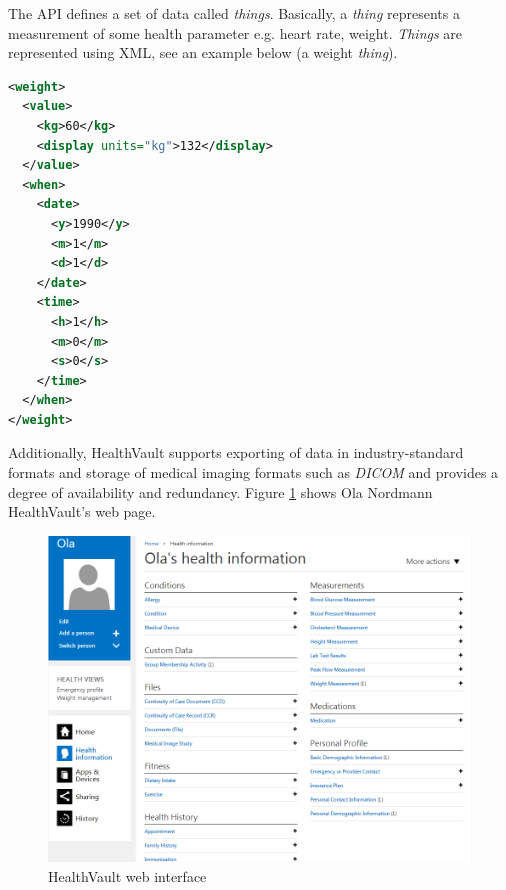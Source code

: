 The API defines a set of data called \textit{things}.
Basically, a \textit{thing} represents a measurement of some health parameter e.g. heart rate, weight.
\textit{Things} are represented using XML, see an example below (a weight \textit{thing}).

\begin{lstlisting}[language=XML]
<weight>
  <value>
    <kg>60</kg>
    <display units="kg">132</display>
  </value>
  <when>
    <date>
      <y>1990</y>
      <m>1</m>
      <d>1</d>
    </date>
    <time>
      <h>1</h>
      <m>0</m>
      <s>0</s>
    </time>
  </when>
</weight>
\end{lstlisting}

Additionally, HealthVault supports exporting of data in industry-standard formats and storage of medical
imaging formats such as \textit{DICOM} and provides a degree of availability and redundancy.
Figure \ref{figure:hv-page} shows Ola Nordmann HealthVault's web page.

\begin{figure}[h]
\begin{center}
\includegraphics[scale=0.50]{../Figures/hv-page.png}
\end{center}
\caption{HealthVault web interface}
\label{figure:hv-page}
\end{figure}

